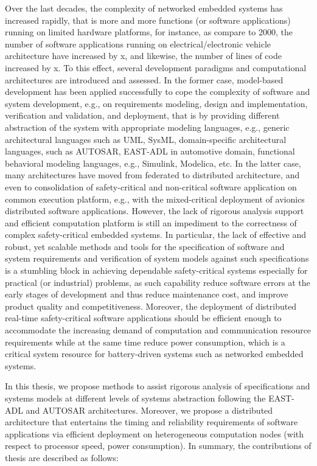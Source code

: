 Over the last decades, the complexity of networked embedded systems has increased rapidly, that is more and more functions (or software applications) running on limited hardware platforms, for instance, as compare to 2000, the number of software applications running on electrical/electronic vehicle architecture have increased by x, and likewise, the number of lines of code increased by x. To this effect, several development paradigms and computational architectures are introduced and assessed. In the former case, model-based development has been applied successfully to cope the complexity of software and system development, e.g., on requirements modeling, design and implementation, verification and validation, and deployment, that is by providing different abstraction of the system with appropriate modeling languages, e.g., generic architectural languages such as UML, SysML, domain-specific architectural languages, such as AUTOSAR, EAST-ADL in automotive domain, functional behavioral modeling languages, e.g., Simulink, Modelica, etc. In the latter case, many architectures have moved from federated to distributed architecture, and even to consolidation of safety-critical and non-critical software application on common execution platform, e.g., with the mixed-critical deployment of avionics distributed software applications. However, the lack of rigorous analysis support and efficient computation platform is still an impediment to the correctness of complex safety-critical embedded systems. In particular, the lack of effective and robust, yet scalable methods and tools for the specification of software and system requirements and verification of system models against such specifications is a stumbling block in achieving dependable safety-critical systems especially for practical (or industrial) problems, as such capability reduce software errors at the early stages of development and thus reduce maintenance cost, and improve product quality and competitiveness. Moreover, the deployment of distributed real-time safety-critical software applications should be efficient enough to accommodate the increasing demand of computation and communication resource requirements while at the same time reduce power consumption, which is a critical system resource for battery-driven systems such as  networked embedded systems.

In this thesis, we propose methods to assist rigorous analysis of specifications and systems models at different levels of systems abstraction following the EAST-ADL and AUTOSAR architectures. Moreover, we propose a distributed architecture that entertains the timing and reliability requirements of software applications via efficient deployment on heterogeneous computation nodes (with respect to  processor speed, power consumption). In summary, the contributions of thesis are described as follows:

